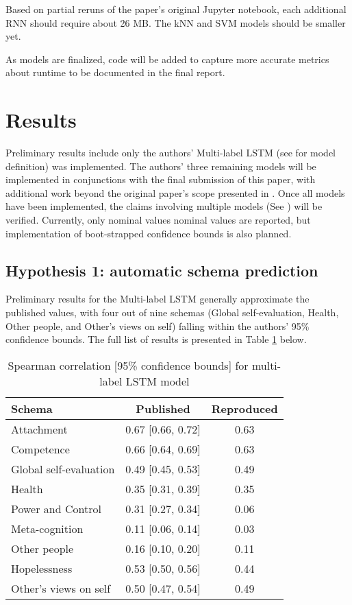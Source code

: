 \documentclass[11pt,a4paper]{article}
\begin{document}
Based on partial reruns of the paper's original Jupyter notebook, each additional RNN should require about 26 MB. The kNN and SVM models should be smaller yet.

As models are finalized, code will be added to capture more accurate metrics about runtime to be documented in the final report. 

\section{Results}
Preliminary results include only the authors' Multi-label LSTM (see  for model definition) was implemented. The authors' three remaining models will be implemented in conjunctions with the final submission of this paper, with additional work beyond the original paper's scope presented in . Once all models have been implemented, the claims involving multiple models (See ) will be verified. Currently, only nominal values nominal values are reported, but implementation of boot-strapped confidence bounds is also planned.

\subsection{Hypothesis 1: automatic schema prediction}
\label{hyp1}
Preliminary results for the Multi-label LSTM generally approximate the published values, with four out of nine schemas (Global self-evaluation, Health, Other people, and Other's views on self) falling within the authors' 95\% confidence bounds. The full list of results is presented in Table \ref{tab:multi_lstm} below. 

\begin{table}[h] %
\centering
\begin{tabular}{lcc}
\toprule
Schema      &Published     &Reproduced \\ %
\midrule
Attachment              & 0.67 [0.66, 0.72] & 0.63 \\
Competence              & 0.66 [0.64, 0.69] & 0.63 \\
Global self-evaluation  & 0.49 [0.45, 0.53] & 0.49 \\
Health                  & 0.35 [0.31, 0.39] & 0.35 \\
Power and Control       & 0.31 [0.27, 0.34] & 0.06 \\
Meta-cognition          & 0.11 [0.06, 0.14] & 0.03 \\
Other people            & 0.16 [0.10, 0.20] & 0.11 \\
Hopelessness            & 0.53 [0.50, 0.56] & 0.44 \\
Other's views on self   & 0.50 [0.47, 0.54] & 0.49 \\
\bottomrule
\end{tabular}
\caption{Spearman correlation [95\% confidence bounds] for multi-label LSTM model}
\label{tab:multi_lstm}
\end{table}
\end{document}
